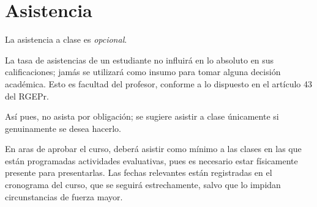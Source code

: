 \section{Asistencia}
La asistencia a clase es \emph{opcional}.

La tasa de asistencias de un estudiante no influirá en lo absoluto en sus calificaciones; jamás se utilizará como insumo para tomar alguna decisión académica. Esto es facultad del profesor, conforme a lo dispuesto en el artículo 43 del RGEPr.

Así pues, no asista por obligación; se sugiere asistir a clase únicamente si genuinamente se desea hacerlo.

En aras de aprobar el curso, deberá asistir como mínimo a las clases en las que están programadas actividades evaluativas, pues es necesario estar físicamente presente para presentarlas. Las fechas relevantes están registradas en el cronograma del curso, que se seguirá estrechamente, salvo que lo impidan circunstancias de fuerza mayor.
